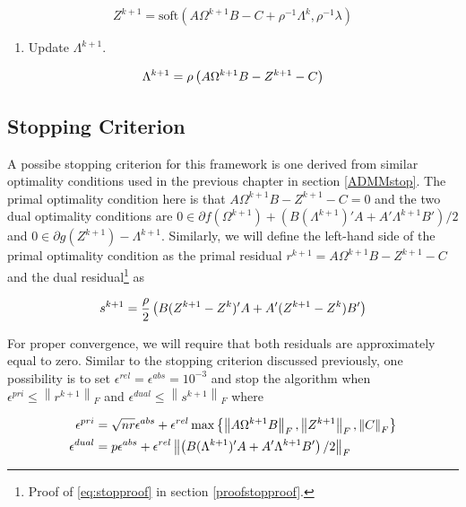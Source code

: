 \documentclass[11pt,]{report}
\providecommand{\tightlist}{%
  \setlength{\itemsep}{0pt}\setlength{\parskip}{0pt}}
\theoremstyle{definition}
\theoremstyle{definition}
\theoremstyle{definition}
\theoremstyle{remark}
\begin{document}
\begin{equation}
Z^{k + 1} = \mbox{soft}\left( A\Omega^{k + 1}B - C + \rho^{-1}\Lambda^{k}, \rho^{-1}\lambda \right)
\label{eq:Zk}
\end{equation}

\begin{enumerate}
\def\labelenumi{\arabic{enumi}.}
\setcounter{enumi}{4}
\tightlist
\item
  Update \(\Lambda^{k + 1}\).
\end{enumerate}

\begin{equation}
\Lambda^{k + 1} = \rho\left( A\Omega^{k + 1} B - Z^{k + 1} - C \right)
\label{eq:Yk}\notag
\end{equation}

\hypertarget{stopping-criterion}{%
\subsection{Stopping Criterion}\label{stopping-criterion}}

A possibe stopping criterion for this framework is one derived from similar optimality conditions used in the previous chapter in section \ref{ADMMstop}. The primal optimality condition here is that \(A\Omega^{k + 1}B - Z^{k + 1} - C = 0\) and the two dual optimality conditions are \(0 \in \partial f\left(\Omega^{k + 1}\right) + \left(B(\Lambda^{k + 1})'A + A'\Lambda^{k + 1}B' \right)/2\) and \(0 \in \partial g\left(Z^{k + 1}\right) - \Lambda^{k + 1}\). Similarly, we will define the left-hand side of the primal optimality condition as the primal residual \(r^{k + 1} = A\Omega^{k + 1}B - Z^{k + 1} - C\) and the dual residual\footnote{Proof of \eqref{eq:stopproof} in section \ref{proofstopproof}.} as

\begin{equation}
s^{k + 1} = \frac{\rho}{2}\left( B(Z^{k + 1} - Z^{k})'A + A'(Z^{k + 1} - Z^{k})B' \right)
\label{eq:stopproof}\notag
\end{equation}

For proper convergence, we will require that both residuals are approximately equal to zero. Similar to the stopping criterion discussed previously, one possibility is to set \(\epsilon^{rel} = \epsilon^{abs} = 10^{-3}\) and stop the algorithm when \(\epsilon^{pri} \leq \left\| r^{k + 1} \right\|_{F}\) and \(\epsilon^{dual} \leq \left\| s^{k + 1} \right\|_{F}\) where

\begin{equation}
\begin{split}
  \epsilon^{pri} &= \sqrt{nr}\epsilon^{abs} + \epsilon^{rel}\max\left\{ \left\| A\Omega^{k + 1}B \right\|_{F}, \left\| Z^{k + 1} \right\|_{F}, \left\| C \right\|_{F} \right\} \\
  \epsilon^{dual} &= p\epsilon^{abs} + \epsilon^{rel}\left\| \left( B(\Lambda^{k + 1})'A + A'\Lambda^{k + 1}B' \right)/2 \right\|_{F}
\label{eq:scpmestopping}\notag
\end{split}
\end{equation}
\end{document}
